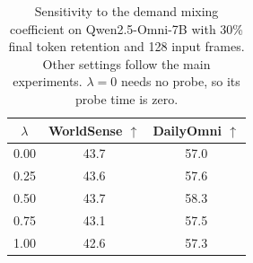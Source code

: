\begin{table}[t]
\centering
\caption{Sensitivity to the demand mixing coefficient on Qwen2.5-Omni-7B with 30\% final token retention and 128 input frames. Other settings follow the main experiments. $\lambda=0$ needs no probe, so its probe time is zero.}
\label{tab:sensitivity_lambda}
\small
\setlength{\tabcolsep}{10pt}
\renewcommand{\arraystretch}{1.08}
\begin{tabular}{@{}ccc@{}}
\toprule
$\lambda$ & WorldSense $\uparrow$ & DailyOmni $\uparrow$ \\
\midrule
0.00 & 43.7 & 57.0 \\
0.25 & 43.6 & 57.6 \\
0.50 & 43.7 & 58.3 \\
0.75 & 43.1 & 57.5 \\
1.00 & 42.6 & 57.3 \\
\bottomrule
\end{tabular}
\end{table}

